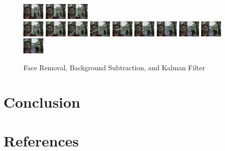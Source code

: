 \documentclass[12pt]{article}
\begin{document}
\begin{figure}[H]
\includegraphics[width=40px, height=30px]{../data/full/img0037.jpg}
\includegraphics[width=40px, height=30px]{../data/full/img0038.jpg}
\includegraphics[width=40px, height=30px]{../data/full/img0039.jpg} \\
\includegraphics[width=40px, height=30px]{../data/full/img0040.jpg}
\includegraphics[width=40px, height=30px]{../data/full/img0041.jpg}
\includegraphics[width=40px, height=30px]{../data/full/img0042.jpg}
\includegraphics[width=40px, height=30px]{../data/full/img0043.jpg}
\includegraphics[width=40px, height=30px]{../data/full/img0044.jpg}
\includegraphics[width=40px, height=30px]{../data/full/img0045.jpg}
\includegraphics[width=40px, height=30px]{../data/full/img0046.jpg}
\includegraphics[width=40px, height=30px]{../data/full/img0047.jpg}
\includegraphics[width=40px, height=30px]{../data/full/img0048.jpg}
\includegraphics[width=40px, height=30px]{../data/full/img0049.jpg}
\label{seq-full}
\caption{Face Removal, Background Subtraction, and Kalman Filter}
\end{figure}


\section{Conclusion}

\section{References}
\end{document}
